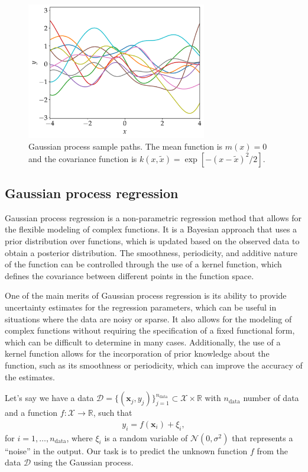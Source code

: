 \begin{figure}[htbp]
    \centering
    \includegraphics[width=0.7\textwidth]{figs/rbf_samples.pdf}
    \caption{Gaussian process sample paths.
    The mean function is $m(x)=0$ and the covariance function is $k(x,\tilde{x})=\exp[-(x-\tilde{x})^{2}/2]$.
    }
    \label{fig:rbf-sample}
\end{figure}


\subsection{Gaussian process regression}
Gaussian process regression is a non-parametric regression method that allows for the flexible modeling of complex functions. It is a Bayesian approach that uses a prior distribution over functions, which is updated based on the observed data to obtain a posterior distribution. The smoothness, periodicity, and additive nature of the function can be controlled through the use of a kernel function, which defines the covariance between different points in the function space.

One of the main merits of Gaussian process regression is its ability to provide uncertainty estimates for the regression parameters, which can be useful in situations where the data are noisy or sparse. It also allows for the modeling of complex functions without requiring the specification of a fixed functional form, which can be difficult to determine in many cases. Additionally, the use of a kernel function allows for the incorporation of prior knowledge about the function, such as its smoothness or periodicity, which can improve the accuracy of the estimates.

Let's say we have a data $\mathcal{D}=\{(\bm{x}_{j},y_{j})\}_{j=1}^{n_{\mathrm{data}}}\subset\mathcal{X}\times\mathbb{R}$ with $n_{\mathrm{data}}$ number of data and a function $f\colon\mathcal{X}\to\mathbb{R}$, such that
\begin{align}
    y_{i}=f(\bm{x}_{i})+\xi_{i},
\end{align}
for $i=1,\dots,n_{\mathrm{data}}$, where $\xi_{i}$ is a random variable of $\mathcal{N}(0,\sigma^{2})$ that represents a ``noise'' in the output.
Our task is to predict the unknown function $f$ from the data $\mathcal{D}$ using the Gaussian process.

